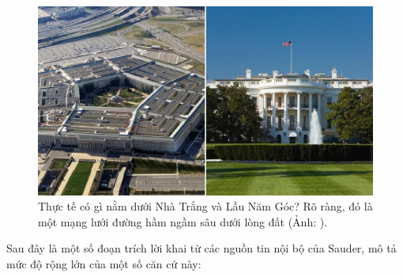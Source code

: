 \begin{figure}[t]
\begin{center}
   \includegraphics[width=1\linewidth]{penta.jpg}
\end{center}
   \caption{Thực tế có gì nằm dưới Nhà Trắng và Lầu Năm Góc? Rõ ràng, đó là một mạng lưới đường hầm ngầm sâu dưới lòng đất (Ảnh: \cite{31}).}
\label{fig:3}
\label{fig:onecol}
\end{figure}

Sau đây là một số đoạn trích lời khai từ các nguồn tin nội bộ của Sauder, mô tả mức độ rộng lớn của một số căn cứ này:

